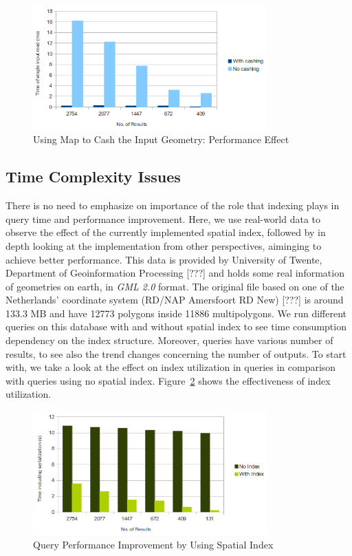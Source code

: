\documentclass[a4paper,12pt]{article}
\begin{document}
 \begin{figure}
\centering
\includegraphics[width=0.8\textwidth]{MapIndexing}
\caption{Using Map to Cash the Input Geometry: Performance Effect}
\label{figMap}
\end{figure}

\subsection{Time Complexity Issues}

There is no need to emphasize on importance of the role that indexing plays in query time and performance improvement. Here, we use real-world data to observe the effect of the currently implemented spatial index, followed by in depth looking at the implementation from other perspectives, aiminging to achieve better performance. This data is provided by University of Twente, Department of Geoinformation Processing [???] and holds some real information of geometries on earth, in \textit{GML 2.0} format. The original file based on one of the Netherlands' coordinate system (RD/NAP Amersfoort RD New) [???] is around 133.3 MB and have 12773 polygons inside 11886 multipolygons.
We run different queries on this database with and without spatial index to see time consumption dependency on the index structure. Moreover, queries have various number of results, to see also the trend changes concerning the number of outputs.
To start with, we take a look at the effect on index utilization in queries in comparison with queries using no spatial index. Figure~\ref{figIndexEfficiency} shows the effectiveness of index utilization.

 \begin{figure}
\centering
\includegraphics[width=0.8\textwidth]{IndexEfficiency}
\caption{Query Performance Improvement by Using Spatial Index}
\label{figIndexEfficiency}
\end{figure}
\end{document}

